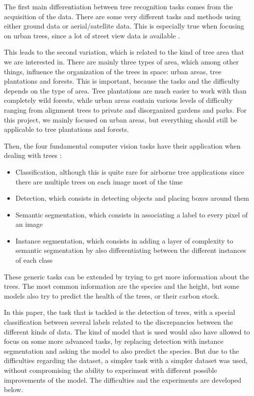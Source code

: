 \documentclass[
]{report}
\providecommand{\tightlist}{%
  \setlength{\itemsep}{0pt}\setlength{\parskip}{0pt}}\usepackage{longtable,booktabs,array}
\begin{document}
The first main differentiation between tree recognition tasks comes from
the acquisition of the data. There are some very different tasks and
methods using either ground data or aerial/satellite data. This is
especially true when focusing on urban trees, since a lot of street view
data is available \autocite{urban-trees}.

This leads to the second variation, which is related to the kind of tree
area that we are interested in. There are mainly three types of area,
which among other things, influence the organization of the trees in
space: urban areas, tree plantations and forests. This is important,
because the tasks and the difficulty depends on the type of area. Tree
plantations are much easier to work with than completely wild forests,
while urban areas contain various levels of difficulty ranging from
alignment trees to private and disorganized gardens and parks. For this
project, we mainly focused on urban areas, but everything should still
be applicable to tree plantations and forests.

Then, the four fundamental computer vision tasks have their application
when dealing with trees \autocite{olive-tree}:

\begin{itemize}
\tightlist
\item
  Classification, although this is quite rare for airborne tree
  applications since there are multiple trees on each image most of the
  time
\item
  Detection, which consists in detecting objects and placing boxes
  around them
\item
  Semantic segmentation, which consists in associating a label to every
  pixel of an image
\item
  Instance segmentation, which consists in adding a layer of complexity
  to semantic segmentation by also differentiating between the different
  instances of each class
\end{itemize}

These generic tasks can be extended by trying to get more information
about the trees. The most common information are the species and the
height, but some models also try to predict the health of the trees, or
their carbon stock.

In this paper, the task that is tackled is the detection of trees, with
a special classification between several labels related to the
discrepancies between the different kinds of data. The kind of model
that is used would also have allowed to focus on some more advanced
tasks, by replacing detection with instance segmentation and asking the
model to also predict the species. But due to the difficulties regarding
the dataset, a simpler task with a simpler dataset was used, without
compromising the ability to experiment with different possible
improvements of the model. The difficulties and the experiments are
developed below.
\end{document}
